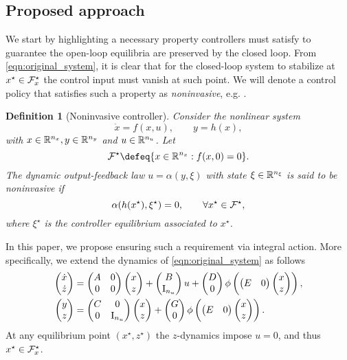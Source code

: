 \documentclass{ifacconf}
\newtheorem{definition}{Definition}
\begin{document}
\subsection{Proposed approach}
We start by highlighting a necessary property controllers must satisfy to guarantee the open-loop equilibria are preserved by the closed loop.
From \eqref{eqn:original_system}, it is clear that for the closed-loop system to stabilize at  $x^\star\in{\mathcal{F}}_x^\star$ the control input must vanish at such point.
We will denote a control policy that satisfies such a property as \textit{noninvasive}, e.g. \citep{ANGELI2024152}. 
\begin{definition}[Noninvasive controller]
Consider the nonlinear system 
\[
\dot x = f(x,u), \qquad y =h(x),
\]
with $x\in{\mathbb{R}}^{n_x}, y\in{\mathbb{R}}^{n_y}$ and $u\in{\mathbb{R}}^{n_u}$. Let 
\[
\cF^\star\defeq\{x\in\RR^{n_x}:f(x,0)=0\}.
\]
The dynamic output-feedback law $u=\alpha(y,\xi)$  with state $\xi\in{\mathbb{R}}^{n_\xi}$ is said to be \textit{ noninvasive} if 
\begin{equation}\label{eqn:noninvasive_cond}
\alpha(h(x^\star),\xi^\star) = 0, \qquad \forall x^\star \in {\mathcal{F}}^\star,
\end{equation}
where $\xi^\star$ is the controller equilibrium associated to $x^\star$.
\end{definition}

In this paper, we propose ensuring such a requirement via integral action. More specifically, we extend the dynamics of \eqref{eqn:original_system} as follows
\begin{equation}\label{eqn:extended_dyn}
\begin{aligned}
\left(\begin{matrix}\dot x\\ \dot z\end{matrix}\right)&= \left(\begin{matrix}A & 0\\0&0\end{matrix}\right) \left(\begin{matrix}x\\ z\end{matrix}\right) + \left(\begin{matrix}B\\\operatorname{I}_{n_u}\end{matrix}\right) u + \left(\begin{matrix}D\\0\end{matrix}\right) \phi\left(\left(\begin{matrix}E&0\end{matrix}\right) \left(\begin{matrix}x\\ z\end{matrix}\right) \right),  \\
 \left(\begin{matrix}y\\z\end{matrix}\right)&= \left(\begin{matrix}C & 0\\0 & \operatorname{I}_{n_u}\end{matrix}\right)\left(\begin{matrix}x\\ z\end{matrix}\right) + \left(\begin{matrix}G\\0\end{matrix}\right) \phi\left(\left(\begin{matrix}E&0\end{matrix}\right)\left(\begin{matrix}x\\ z\end{matrix}\right) \right).
\end{aligned}
\end{equation}
At any equilibrium point $(x^\star,z^\star)$ the $z$-dynamics impose $u=0$, and thus $x^\star \in {\mathcal{F}}_x^\star$. 
\end{document}
